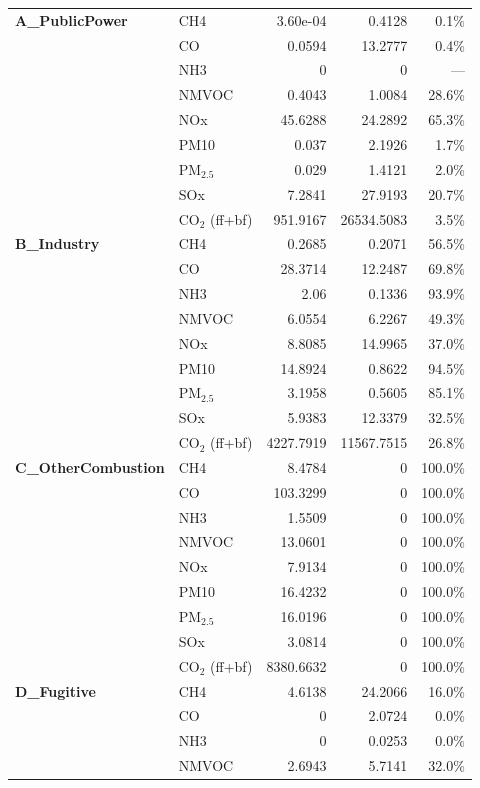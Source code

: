 \begin{longtable}{@{}llrrr@{}}
\textbf{A\_PublicPower} & CH4 & 3.60e-04 & 0.4128 & 0.1\% \\
 & CO & 0.0594 & 13.2777 & 0.4\% \\
 & NH3 & 0 & 0 & --- \\
 & NMVOC & 0.4043 & 1.0084 & 28.6\% \\
 & NOx & 45.6288 & 24.2892 & 65.3\% \\
 & PM10 & 0.037 & 2.1926 & 1.7\% \\
 & PM$_{2.5}$ & 0.029 & 1.4121 & 2.0\% \\
 & SOx & 7.2841 & 27.9193 & 20.7\% \\
 & CO$_2$ (ff+bf) & 951.9167 & 26534.5083 & 3.5\% \\
\midrule
\addlinespace[2pt]
\textbf{B\_Industry} & CH4 & 0.2685 & 0.2071 & 56.5\% \\
 & CO & 28.3714 & 12.2487 & 69.8\% \\
 & NH3 & 2.06 & 0.1336 & 93.9\% \\
 & NMVOC & 6.0554 & 6.2267 & 49.3\% \\
 & NOx & 8.8085 & 14.9965 & 37.0\% \\
 & PM10 & 14.8924 & 0.8622 & 94.5\% \\
 & PM$_{2.5}$ & 3.1958 & 0.5605 & 85.1\% \\
 & SOx & 5.9383 & 12.3379 & 32.5\% \\
 & CO$_2$ (ff+bf) & 4227.7919 & 11567.7515 & 26.8\% \\
 \midrule
\addlinespace[2pt]
\textbf{C\_OtherCombustion} & CH4 & 8.4784 & 0 & 100.0\% \\
 & CO & 103.3299 & 0 & 100.0\% \\
 & NH3 & 1.5509 & 0 & 100.0\% \\
 & NMVOC & 13.0601 & 0 & 100.0\% \\
 & NOx & 7.9134 & 0 & 100.0\% \\
 & PM10 & 16.4232 & 0 & 100.0\% \\
 & PM$_{2.5}$ & 16.0196 & 0 & 100.0\% \\
 & SOx & 3.0814 & 0 & 100.0\% \\
 & CO$_2$ (ff+bf) & 8380.6632 & 0 & 100.0\% \\
 \midrule
\addlinespace[2pt]
\textbf{D\_Fugitive} & CH4 & 4.6138 & 24.2066 & 16.0\% \\
 & CO & 0 & 2.0724 & 0.0\% \\
 & NH3 & 0 & 0.0253 & 0.0\% \\
 & NMVOC & 2.6943 & 5.7141 & 32.0\% \\

\end{longtable}
